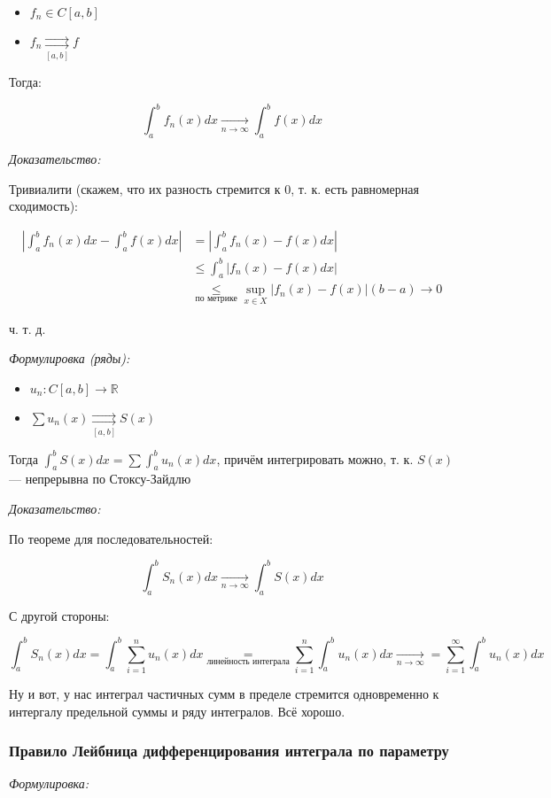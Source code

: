 \documentclass{article}
\def\rsh#1{\underset{#1}{\rightrightarrows}}
\begin{document}
\begin{itemize}
    \item $f_n \in C[a, b]$
    \item $f_n \rsh{[a, b]} f$
\end{itemize}

Тогда:

\[\int_a^b{f_n(x)dx} \underset{n \rightarrow \infty}{\longrightarrow} \int_a^b{f(x)dx}\]

\textit{Доказательство:}

Тривиалити (скажем, что их разность стремится к 0, т. к. есть равномерная сходимость): 

\begin{align*}
    \left|\int_a^b{f_n(x)dx} - \int_a^b{f(x)dx}\right|
 &=  \left|\int_a^b{f_n(x) - f(x)dx}\right| \\
  &\le \int_a^b \left|f_n(x) - f(x) dx\right| \\ 
  &\underset{\text{по метрике}}{\le} {\sup_{x \in X} \left|f_n(x) - f(x)\right|}(b - a) \rightarrow 0
\end{align*}

ч. т. д.

\textit{Формулировка (ряды):}

\begin{itemize}
    \item $u_n: C[a, b] \rightarrow \mathbb{R}$
    \item $\sum u_n(x) \rsh{[a, b]} S(x)$
\end{itemize}

Тогда $\int_a^bS(x)dx =\sum \int_a^b u_n(x) dx$, причём интегрировать можно, т. к. $S(x)$ --- непрерывна по Стоксу-Зайдлю

\textit{Доказательство:}

По теореме для последовательностей: 

\[\int_a^b S_n(x) dx \underset{n \rightarrow \infty}{\longrightarrow} \int_a^b S(x) dx\]

С другой стороны:

\[\int_a^b S_n(x) dx = \int_a^b \sum_{i = 1}^n u_n(x) dx \underset{\text{линейность интеграла}}{=} \sum_{i = 1}^n \int_a^b u_n(x) dx \underset{n \rightarrow \infty}{\longrightarrow} = \sum_{i = 1}^{\infty} \int_a^b u_n(x) dx\]

Ну и вот, у нас интеграл частичных сумм в пределе стремится одновременно к интергалу предельной суммы и ряду интегралов. Всё хорошо.

\subsubsection{Правило Лейбница дифференцирования интеграла по параметру}
\textit{Формулировка:}
\end{document}
